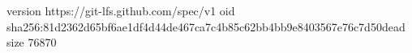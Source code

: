 version https://git-lfs.github.com/spec/v1
oid sha256:81d2362d65bf6ae1df4d44de467ca7c4b85c62bb4bb9e8403567e76c7d50dead
size 76870
